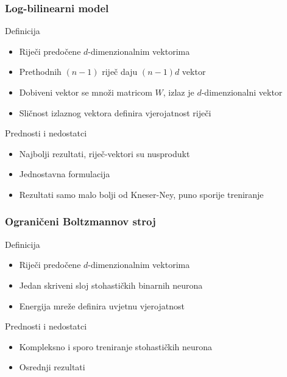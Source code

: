 \documentclass[utf8]{beamer}
\begin{document}
\begin{frame}
\frametitle{Log-bilinearni model}

	\begin{block}{Definicija}
	\begin{itemize}
		\item{Riječi predočene $d$-dimenzionalnim vektorima}
		\item{Prethodnih $(n - 1)$ riječ daju $(n - 1) d$ vektor}
		\item{Dobiveni vektor se množi matricom $W$, izlaz je $d$-dimenzionalni vektor}
		\item{Sličnost izlaznog vektora definira vjerojatnost riječi}
	\end{itemize}
	\end{block}

	\begin{block}{Prednosti i nedostatci}
	\begin{itemize}
		\item{Najbolji rezultati, riječ-vektori su nusprodukt}
		\item{Jednostavna formulacija}
		\item{Rezultati samo malo bolji od Kneser-Ney, puno sporije treniranje}
	\end{itemize}
	\end{block}

\end{frame}

\begin{frame}
\frametitle{Ograničeni Boltzmannov stroj}

	\begin{block}{Definicija}
	\begin{itemize}
		\item{Riječi predočene $d$-dimenzionalnim vektorima}
		\item{Jedan skriveni sloj stohastičkih binarnih neurona}
		\item{Energija mreže definira uvjetnu vjerojatnost}
	\end{itemize}
	\end{block}

	\begin{block}{Prednosti i nedostatci}
	\begin{itemize}
		\item{Kompleksno i sporo treniranje stohastičkih neurona}
		\item{Osrednji rezultati}
	\end{itemize}
	\end{block}

\end{frame}
\end{document}

